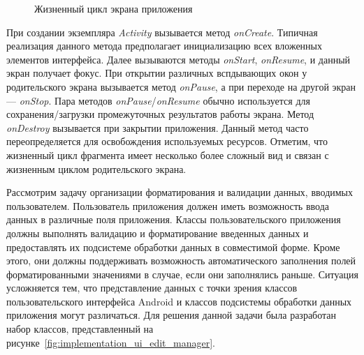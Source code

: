\begin{figure}[h!]
  \centering
  \caption{Жизненный цикл экрана приложения}
  \label{fig:implementation_ui_lifecycle_activity}
\end{figure}

При создании экземпляра \textit{Activity} вызывается метод \textit{onCreate}.
Типичная реализация данного метода предполагает инициализацию
всех вложенных элементов интерфейса.
Далее вызываются методы \textit{onStart}, \textit{onResume},
и данный экран получает фокус.
При открытии различных вспдывающих окон у родительского экрана вызывается
метод \textit{onPause}, а при переходе на другой экран --- \textit{onStop}.
Пара методов \textit{onPause}/\textit{onResume} обычно используется для
сохранения/загрузки промежуточных результатов работы экрана.
Метод \textit{onDestroy} вызывается при закрытии приложения.
Данный метод часто переопределяется для освобождения используемых ресурсов.
Отметим, что жизненный цикл фрагмента имеет несколько более сложный вид
и связан с жизненным циклом родительского экрана.

Рассмотрим задачу организации форматирования и валидации данных,
вводимых пользователем.
Пользователь приложения должен иметь возможность ввода данных в
различные поля приложения.
Классы пользовательского приложения должны выполнять валидацию и форматирование
введенных данных и предоставлять их подсистеме обработки данных в совместимой форме.
Кроме этого, они должны поддерживать возможность автоматического
заполнения полей форматированными значениями в случае, если они заполнялись раньше.
Ситуация усложняется тем, что представление данных с точки зрения классов
пользовательского интерфейса Android и классов подсистемы обработки данных
приложения могут различаться.
Для решения данной задачи была разработан набор классов, представленный
на рисунке~\ref{fig:implementation_ui_edit_manager}.

